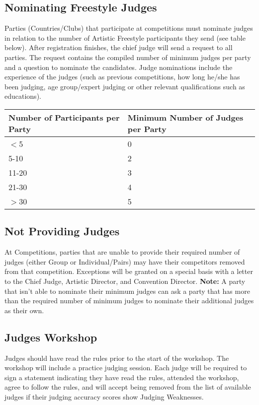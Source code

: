 \subsection{Nominating Freestyle Judges \label{subsec:freestyle_judging-panel_nominating-freestyle-judges}}
Parties (Countries/Clubs) that participate at competitions must nominate judges in relation to the number of Artistic Freestyle participants they send (see table below). 
After registration finishes, the chief judge will send a request to all parties.
The request contains the compiled number of minimum judges per party and a question to nominate the candidates.
Judge nominations include the experience of the judges (such as previous competitions, how long he/she has been judging, age group/expert judging or other relevant qualifications such as educations).

\begin{tabular}{|l|l|}
\hline
\textbf{Number of Participants per Party} & \textbf{Minimum Number of Judges per Party} \\
\hline
$<$5 & 0 \\
\hline
5-10 & 2 \\
\hline
11-20 & 3 \\
\hline
21-30 & 4 \\
\hline
$>$30 & 5 \\
\hline
\end{tabular}

\subsection{Not Providing Judges}

At Competitions, parties that are unable to provide their required number of judges (either Group or Individual/Pairs) may have their competitors removed from that competition.
Exceptions will be granted on a special basis with a letter to the Chief Judge, Artistic Director, and Convention Director. 
\textbf{Note:} A party that isn’t able to nominate their minimum judges can ask a party that has more than the required number of minimum judges to nominate their additional judges as their own.

\subsection{Judges Workshop}

Judges should have read the rules prior to the start of the workshop.
The workshop will include a practice judging session.
Each judge will be required to sign a statement indicating they have read the rules, attended the workshop, agree to follow the rules, and will accept being removed from the list of available judges if their judging accuracy scores show Judging Weaknesses.


